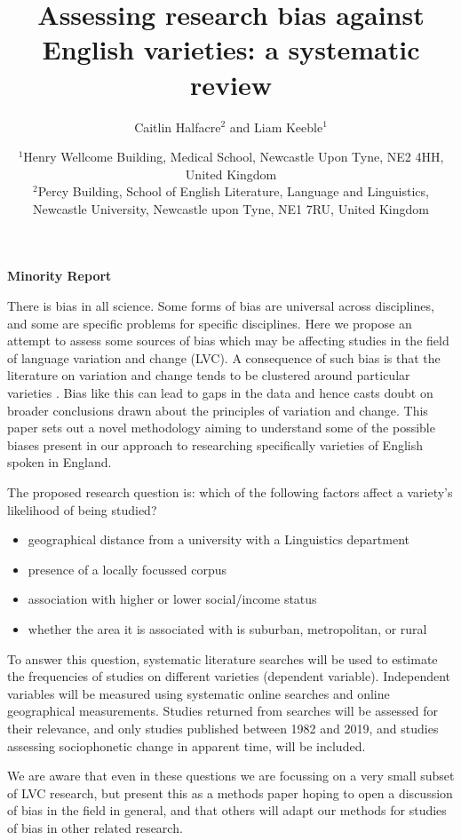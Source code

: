 \documentclass[12pt,a4paper]{article}
\title{Assessing research bias against English varieties: a systematic review}
\author{Caitlin Halfacre$^{2}$ and Liam Keeble$^{1}$}
\date{$^{1}$Henry Wellcome Building, Medical School, Newcastle Upon Tyne, NE2 4HH, United Kingdom\\
$^{2}$Percy Building, School of English Literature, Language and Linguistics, Newcastle University, Newcastle upon Tyne, NE1 7RU, United Kingdom\\}
\newcommand{\todocontentinline}[1]{\todo[color=RoyalPurple,inline]{#1}}
\begin{document}
\begin{center}
	\textbf{Minority Report}\\
\end{center}

\todocontentinline{Current word count 297}
There is bias in all science. Some forms of bias are universal across disciplines, and some are specific problems for specific disciplines. Here we propose an attempt to assess some sources of bias which may be affecting studies in the field of language variation and change (LVC).  
A consequence of such bias is that the literature on variation and change tends to be clustered around particular varieties \cite{Trudgill2002}. Bias like this can lead to gaps in the data and hence casts doubt on broader conclusions drawn about the principles of variation and change. This paper sets out a novel methodology aiming to understand some of the possible biases present in our approach to researching specifically varieties of English spoken in England. 
	
The proposed research question is: which of the following factors affect a variety's likelihood of being studied?
	\begin{itemize}
		\item geographical distance from a university with a Linguistics department
		\item presence of a locally focussed corpus
		\item association with higher or lower social/income status
		\item whether the area it is associated with is suburban, metropolitan, or rural
	\end{itemize}


To answer this question, systematic literature searches will be used to estimate the frequencies of studies on different varieties (dependent variable). Independent variables will be measured using systematic online searches and online geographical measurements. Studies returned from searches will be assessed for their relevance, and only studies published between 1982 \citep{Wells1982b} and 2019, and studies assessing sociophonetic change in apparent time, will be included.

We are aware that even in these questions we are focussing on a very small subset of LVC research, but present this as a methods paper hoping to open a discussion of bias in the field in general, and that others will adapt our methods for studies of bias in other related research.


\end{document}
